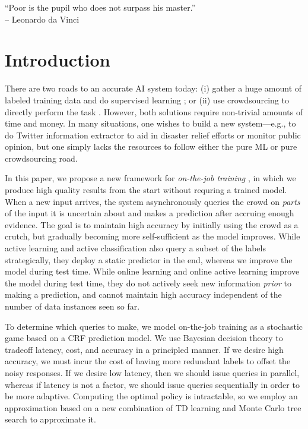 \begin{epigraph}
``Poor is the pupil who does not surpass his master.''\\
-- Leonardo da Vinci
\end{epigraph}


\section{Introduction}
\label{sec:intro}

There are two roads to an accurate AI system today:
(i) gather a huge amount of labeled training data \citep{deng2009imagenet} and do supervised learning \citep{krizhevsky2012imagenet};
or (ii) use crowdsourcing to directly perform the task \citep{bernstein2010soylent,kokkalis2013emailvalet}.
However, both solutions require non-trivial amounts of time and money.
In many situations, one wishes to build a new system---e.g., to do Twitter information extractor
\citep{li2012twiner} to aid in disaster relief efforts or monitor public
opinion, but one simply lacks the resources to follow either the pure ML or pure crowdsourcing road.

In this paper, we propose a new framework for \emph{on-the-job training} \citep{lasecki2013real},
in which we produce high quality results from the start without requring a trained model.
When a new input arrives,
the system asynchronously queries the crowd on \emph{parts} of the input it is
uncertain about and makes a prediction after accruing enough evidence.
The goal is to maintain high accuracy by initially using the crowd as a crutch,
but gradually becoming more self-sufficient as the model improves.
While active learning \citep{settles2010active} and active classification \citep{gao2011active}
also query a subset of the labels strategically,
they deploy a static predictor in the end,
whereas we improve the model during test time.
While online learning \citep{cesabianchi06prediction} and
online active learning \citep{helmbold1997some,sculley2007online,chu2011unbiased}
improve the model during test time,
they do not actively seek new information \emph{prior} to making a prediction,
and cannot maintain high accuracy independent of the number of data instances seen so far.

To determine which queries to make,
we model on-the-job training as a stochastic game based on a CRF prediction model.
We use Bayesian decision theory to tradeoff latency, cost, and accuracy in a principled manner.
If we desire high accuracy, we must incur the cost of having more redundant labels
to offset the noisy responses.  If we desire low latency, then we should issue queries
in parallel, whereas if latency is not a factor, we should issue queries
sequentially in order to be more adaptive.
Computing the optimal policy is intractable,
so we employ an approximation
based on a new combination of TD learning \citep{sutton1988learning}
and Monte Carlo tree search \citep{kocsis2006bandit} to approximate it.

